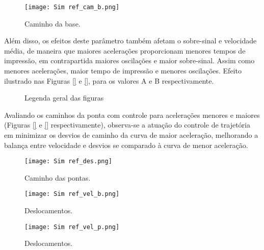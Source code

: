 \begin{figure}[H]
    \centering
    \caption{Caminho da base.}
    \texttt{[image: Sim ref\_cam\_b.png]}

    \label{fig:ref_cam_b}
\end{figure}

Além disso, os efeitos deste parâmetro também afetam o sobre-sinal e velocidade média, de maneira que maiores acelerações proporcionam menores tempos de impressão, em contrapartida maiores oscilações e maior sobre-sinal. Assim como menores acelerações, maior tempo de impressão e menores oscilações. Efeito ilustrado nas Figuras \ref{} e \ref{}, para os valores A e B respectivamente.

\begin{figure}[H]
    \centering
    \hfill
    \caption{Legenda geral das figuras}
    \label{fig:ref_cam_p_s}
\end{figure}

Avaliando os caminhos da ponta com controle para acelerações menores e maiores (Figuras \ref{} e \ref{} respectivamente), observa-se a atuação do controle de trajetória em minimizar os desvios de caminho da curva de maior aceleração, melhorando a balança entre velocidade e desvios se comparado à curva de menor aceleração.

\begin{figure}[H]
    \centering
    \caption{Caminho das pontas.}
    \texttt{[image: Sim ref\_des.png]}

    \label{fig:ref_des}
\end{figure}

\begin{figure}[H]
    \centering
    \caption{Deslocamentos.}
    \texttt{[image: Sim ref\_vel\_b.png]}

    \label{fig:ref_vel_b}
\end{figure}

\begin{figure}[H]
    \centering
    \caption{Deslocamentos.}
    \texttt{[image: Sim ref\_vel\_p.png]}

    \label{fig:ref_vel_p}
\end{figure}

